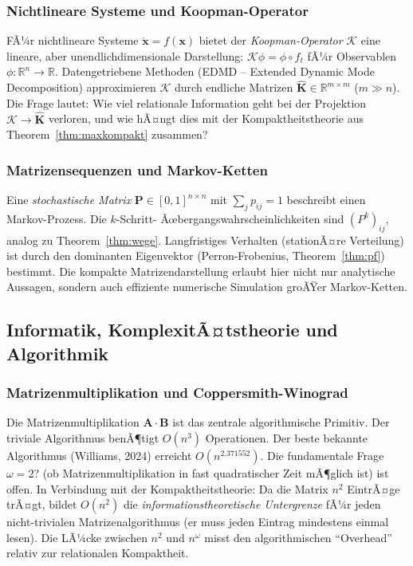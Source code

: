 ﻿\documentclass[12pt, a4paper]{article}
\theoremstyle{definition}
\theoremstyle{remark}
\newcommand{\R}{\mathbb{R}}
\newcommand{\vx}{\bm{x}}
\newcommand{\vA}{\bm{A}}
\newcommand{\vB}{\bm{B}}
\newcommand{\vP}{\bm{P}}
\newcommand{\vK}{\bm{K}}
\begin{document}
\subsubsection*{Nichtlineare Systeme und Koopman-Operator}

FÃ¼r nichtlineare Systeme $\dot{\vx} = f(\vx)$ bietet der
\emph{Koopman-Operator} $\mathcal{K}$ eine lineare, aber
unendlichdimensionale Darstellung: $\mathcal{K} \phi = \phi \circ f_t$
fÃ¼r Observablen $\phi: \R^n \to \R$. Datengetriebene Methoden
(EDMD -- Extended Dynamic Mode Decomposition) approximieren $\mathcal{K}$
durch endliche Matrizen $\hat{\vK} \in \R^{m \times m}$ ($m \gg n$).
Die Frage lautet: Wie viel relationale Information geht bei der
Projektion $\mathcal{K} \to \hat{\vK}$ verloren, und wie hÃ¤ngt dies mit
der Kompaktheitstheorie aus Theorem~\ref{thm:maxkompakt} zusammen?

\subsubsection*{Matrizensequenzen und Markov-Ketten}

Eine \emph{stochastische Matrix} $\vP \in [0,1]^{n \times n}$ mit
$\sum_j p_{ij} = 1$ beschreibt einen Markov-Prozess. Die $k$-Schritt-
Ãœbergangswahrscheinlichkeiten sind $(P^k)_{ij}$, analog zu
Theorem~\ref{thm:wege}. Langfristiges Verhalten (stationÃ¤re Verteilung)
ist durch den dominanten Eigenvektor (Perron-Frobenius,
Theorem~\ref{thm:pf}) bestimmt. Die kompakte Matrizendarstellung erlaubt
hier nicht nur analytische Aussagen, sondern auch effiziente numerische
Simulation groÃŸer Markov-Ketten.

\subsection{Informatik, KomplexitÃ¤tstheorie und Algorithmik}
\label{subsec:algo_ausblick}

\subsubsection*{Matrizenmultiplikation und Coppersmith-Winograd}

Die Matrizenmultiplikation $\vA \cdot \vB$ ist das zentrale algorithmische
Primitiv. Der triviale Algorithmus benÃ¶tigt $O(n^3)$ Operationen. Der
beste bekannte Algorithmus (Williams, 2024) erreicht $O(n^{2.371552})$.
Die fundamentale Frage $\omega = 2$? (ob Matrizenmultiplikation in fast
quadratischer Zeit mÃ¶glich ist) ist offen. In Verbindung mit der
Kompaktheitstheorie: Da die Matrix $n^2$ EintrÃ¤ge trÃ¤gt, bildet
$O(n^2)$ die \emph{informationstheoretische Untergrenze} fÃ¼r jeden
nicht-trivialen Matrizenalgorithmus (er muss jeden Eintrag mindestens
einmal lesen). Die LÃ¼cke zwischen $n^2$ und $n^\omega$ misst den
algorithmischen ``Overhead'' relativ zur relationalen Kompaktheit.
\end{document}
